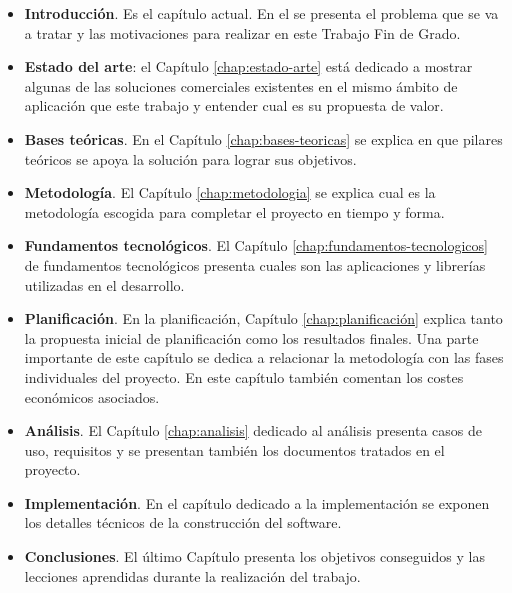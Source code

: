 \begin{itemize}
    \item \textbf{Introducción}. Es el capítulo actual. En el se presenta el problema que se va a tratar y las motivaciones para realizar en este Trabajo Fin de Grado.
    \item \textbf{Estado del arte}: el Capítulo \ref{chap:estado-arte} está dedicado a mostrar algunas de las soluciones comerciales existentes en el mismo ámbito de aplicación que este trabajo y entender cual es su propuesta de valor.
    \item \textbf{Bases teóricas}. En el Capítulo \ref{chap:bases-teoricas} se explica en que pilares teóricos se apoya la solución para lograr sus objetivos.
    \item \textbf{Metodología}. El Capítulo \ref{chap:metodologia} se explica cual es la metodología escogida para completar el proyecto en tiempo y forma.
    \item \textbf{Fundamentos tecnológicos}. El Capítulo \ref{chap:fundamentos-tecnologicos} de fundamentos tecnológicos presenta cuales son las aplicaciones y librerías utilizadas en el desarrollo.
    \item \textbf{Planificación}. En la planificación, Capítulo \ref{chap:planificación} explica tanto la propuesta inicial de planificación como los resultados finales. Una parte importante de este capítulo se dedica a relacionar la metodología con las fases individuales del proyecto. En este capítulo también comentan los costes económicos asociados.
    \item \textbf{Análisis}. El Capítulo \ref{chap:analisis} dedicado al análisis presenta casos de uso, requisitos y se presentan también los documentos tratados en el proyecto.
    \item \textbf{Implementación}. En el capítulo dedicado a la implementación se exponen los detalles técnicos de la construcción del software.
    \item \textbf{Conclusiones}. El último Capítulo presenta los objetivos conseguidos y las lecciones aprendidas durante la realización del trabajo.
\end{itemize}
